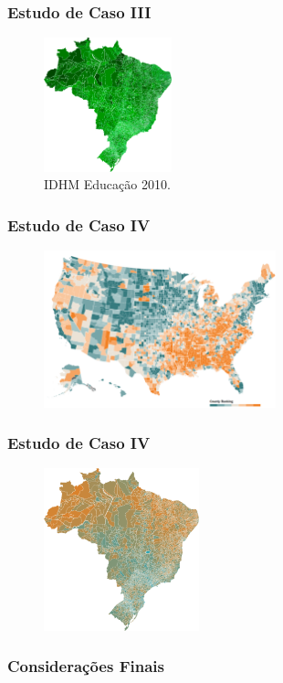 \documentclass[aspectratio=169]{beamer}
\begin{document}
\begin{frame}
\frametitle{Estudo de Caso III}
\justifying


\begin{figure}
\centering
\includegraphics[width=0.33\textwidth]{images/educacao-2010.png}
\caption{IDHM Educação 2010.}
\end{figure}

\end{frame}

\begin{frame}
\frametitle{Estudo de Caso IV}
\justifying

\begin{figure}
\centering
\includegraphics[width=0.6\textwidth]{images/usa.png}
\end{figure}


\end{frame}

\begin{frame}
\frametitle{Estudo de Caso IV}
\justifying

\begin{figure}
\centering
\includegraphics[width=0.4\textwidth]{images/qualidade-de-vida.png}
\end{figure}


\end{frame}

\begin{frame}
\frametitle{Considerações Finais}
\justifying





\end{frame}
\end{document}

